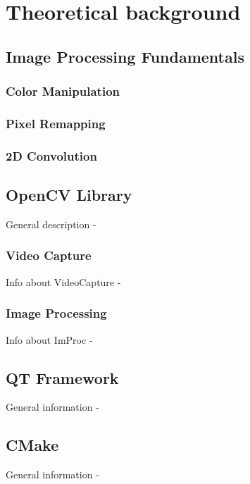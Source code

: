 \chapter{Theoretical background}

\section{Image Processing Fundamentals}

\subsection{Color Manipulation}

\subsection{Pixel Remapping}

\subsection{2D Convolution}

\section{OpenCV Library}

General description - \cite{opencvAbout}

\subsection{Video Capture}

Info about VideoCapture - \cite{opencvVideoCapture}

\subsection{Image Processing}

Info about ImProc - \cite{opencvImproc}

\section{QT Framework}
General information - \cite{qtAbout}

\section{CMake}
General information - \cite{cmakeAbout}

